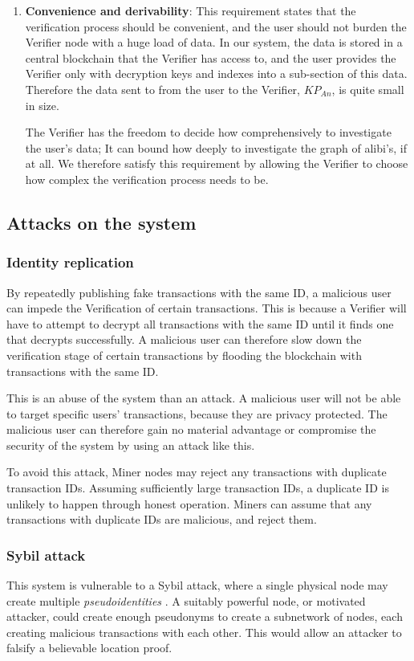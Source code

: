 \documentclass[12pt]{article}
\begin{document}
\begin{enumerate}
\item[] \textbf{Convenience and derivability}: This requirement states that the verification process should be convenient, and the user should not burden the Verifier node with a huge load of data. In our system, the data is stored in a central blockchain that the Verifier has access to, and the user provides the Verifier only with decryption keys and indexes into a sub-section of this data. Therefore the data sent to from the user to the Verifier, $KP_{An}$, is quite small in size.

The Verifier has the freedom to decide how comprehensively to investigate the user's data; It can bound how deeply to investigate the graph of alibi's, if at all. We therefore satisfy this requirement by allowing the Verifier to choose how complex the verification process needs to be.
\end{enumerate}

\subsection{Attacks on the system}
\subsubsection{Identity replication}
By repeatedly publishing fake transactions with the same ID, a malicious user can impede the Verification of certain transactions. This is because a Verifier will have to attempt to decrypt all transactions with the same ID until it finds one that decrypts successfully. A malicious user can therefore slow down the verification stage of certain transactions by flooding the blockchain with transactions with the same ID.

This is an abuse of the system than an attack. A malicious user will not be able to target specific users' transactions, because they are privacy protected. The malicious user can therefore gain no material advantage or compromise the security of the system by using an attack like this.

To avoid this attack, Miner nodes may reject any transactions with duplicate transaction IDs. Assuming sufficiently large transaction IDs, a duplicate ID is unlikely to happen through honest operation. Miners can assume that any transactions with duplicate IDs are malicious, and reject them.

\subsubsection{Sybil attack}
This system is vulnerable to a Sybil attack, where a single physical node may create multiple \textit{pseudoidentities} \cite{sybil}. A suitably powerful node, or motivated attacker, could create enough pseudonyms to create a subnetwork of nodes, each creating malicious transactions with each other. This would allow an attacker to falsify a believable location proof.
\end{document}
